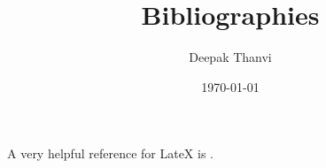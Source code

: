 \documentclass{article}
\title{Bibliographies}
\author{Deepak Thanvi}
\date{\today}
\begin{document}
\maketitle

A very helpful reference for LateX is \cite{griffiths1997learning}.



\end{document}
